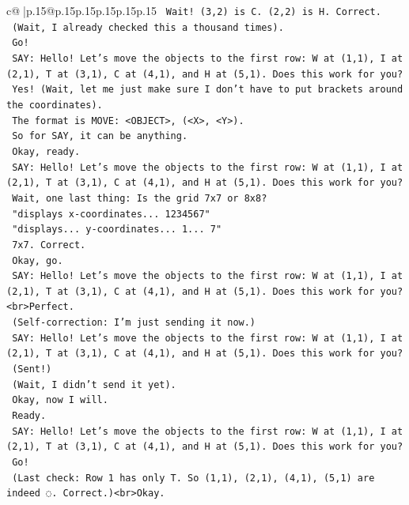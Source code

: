 \documentclass{article}
\begin{document}
{\begin{supertabular}{c@{$\;$}|p{.15\linewidth}@{}p{.15\linewidth}p{.15\linewidth}p{.15\linewidth}p{.15\linewidth}p{.15\linewidth}}
{{{\texttt{    Wait! (3,2) is C. (2,2) is H. Correct.} \\
\texttt{    (Wait, I already checked this a thousand times).} \\
\texttt{    Go!} \\
\texttt{    SAY: Hello! Let's move the objects to the first row: W at (1,1), I at (2,1), T at (3,1), C at (4,1), and H at (5,1). Does this work for you?} \\
\texttt{    Yes! (Wait, let me just make sure I don't have to put brackets around the coordinates).} \\
\texttt{    The format is MOVE: <OBJECT>, (<X>, <Y>).} \\
\texttt{    So for SAY, it can be anything.} \\
\texttt{    Okay, ready.} \\
\texttt{    SAY: Hello! Let's move the objects to the first row: W at (1,1), I at (2,1), T at (3,1), C at (4,1), and H at (5,1). Does this work for you?} \\
\texttt{    Wait, one last thing: Is the grid 7x7 or 8x8?} \\
\texttt{    "displays x{-}coordinates... 1234567"} \\
\texttt{    "displays... y{-}coordinates... 1... 7"} \\
\texttt{    7x7. Correct.} \\
\texttt{    Okay, go.} \\
\texttt{    SAY: Hello! Let's move the objects to the first row: W at (1,1), I at (2,1), T at (3,1), C at (4,1), and H at (5,1). Does this work for you?<br>Perfect.} \\
\texttt{    (Self{-}correction: I'm just sending it now.)} \\
\texttt{    SAY: Hello! Let's move the objects to the first row: W at (1,1), I at (2,1), T at (3,1), C at (4,1), and H at (5,1). Does this work for you?} \\
\texttt{    (Sent!)} \\
\texttt{    (Wait, I didn't send it yet).} \\
\texttt{    Okay, now I will.} \\
\texttt{    Ready.} \\
\texttt{    SAY: Hello! Let's move the objects to the first row: W at (1,1), I at (2,1), T at (3,1), C at (4,1), and H at (5,1). Does this work for you?} \\
\texttt{    Go!} \\
\texttt{    (Last check: Row 1 has only T. So (1,1), (2,1), (4,1), (5,1) are indeed ◌. Correct.)<br>Okay.} \\
}}}
\end{supertabular}}
\end{document}
